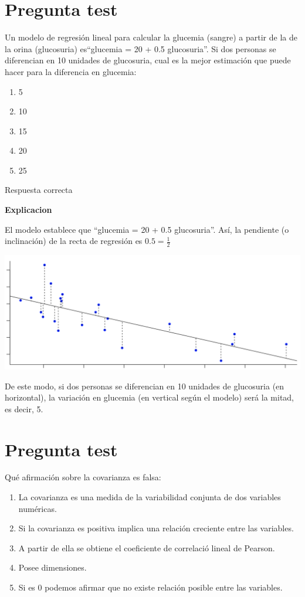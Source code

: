 \documentclass[
]{book}
\providecommand{\tightlist}{%
  \setlength{\itemsep}{0pt}\setlength{\parskip}{0pt}}
\begin{document}
\hypertarget{pregunta-test-121}{%
\section{Pregunta test}\label{pregunta-test-121}}

Un modelo de regresión lineal para calcular la glucemia (sangre) a partir de la de la orina (glucosuria) es``glucemia = 20 + 0.5 glucosuria''. Si dos personas se diferencian en 10 unidades de glucosuria, cual es la mejor estimación que puede hacer para la diferencia en glucemia:

\begin{enumerate}
\def\labelenumi{\alph{enumi})}
\tightlist
\item
  5
\item
  10
\item
  15
\item
  20
\item
  25
\end{enumerate}

Respuesta correcta

\textbf{Explicacion}

El modelo establece que ``glucemia = 20 + 0.5 glucosuria''. Así, la pendiente (o inclinación) de la recta de regresión es \(0.5 = \frac{1}{2}\)

\includegraphics[width=23.72in]{img/4_2}

De este modo, si dos personas se diferencian en 10 unidades de glucosuria (en horizontal), la variación en glucemia (en vertical según el modelo) será la mitad, es decir, 5.

\hypertarget{pregunta-test-122}{%
\section{Pregunta test}\label{pregunta-test-122}}

Qué afirmación sobre la covarianza es falsa:

\begin{enumerate}
\def\labelenumi{\alph{enumi})}
\tightlist
\item
  La covarianza es una medida de la variabilidad conjunta de dos variables numéricas.
\item
  Si la covarianza es positiva implica una relación creciente entre las variables.
\item
  A partir de ella se obtiene el coeficiente de correlació lineal de Pearson.
\item
  Posee dimensiones.
\item
  Si es 0 podemos afirmar que no existe relación posible entre las variables.
\end{enumerate}
\end{document}
